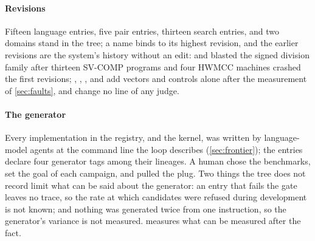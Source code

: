 \paragraph{Revisions}
Fifteen language entries, five pair entries, thirteen search entries,
and two domains stand in the tree; a name binds to its highest
revision, and the earlier revisions are the system's history without
an edit:  and  blasted the signed
division family after thirteen SV-COMP programs and four HWMCC
machines crashed the first revisions; , ,
, and  add vectors and controls alone after
the measurement of \cref{sec:faults}, and change no line of any
judge.

\paragraph{The generator}
Every implementation in the registry, and the kernel, was written by
language-model agents at the command line the loop describes
(\cref{sec:frontier}); the entries declare four generator tags among
their lineages. A human chose the benchmarks, set the goal of each
campaign, and pulled the plug. Two things the tree does not record
limit what can be said about the generator: an entry that fails the
gate leaves no trace, so the rate at which candidates were refused
during development is not known; and nothing was generated twice
from one instruction, so the generator's variance is not measured.
 measures what can be measured after the fact.
